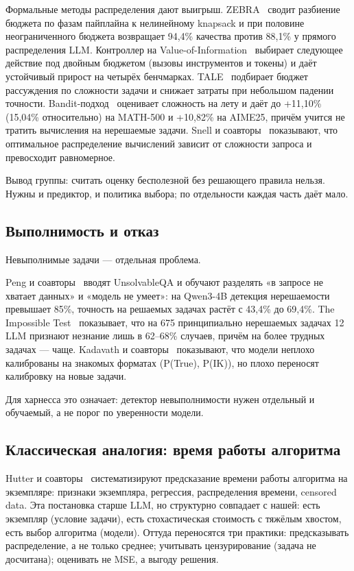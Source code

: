 \documentclass[11pt,a4paper]{article}
\begin{document}
Формальные методы распределения дают выигрыш. ZEBRA~\cite{hamri2026zebra}
сводит разбиение бюджета по фазам пайплайна к нелинейному knapsack и при
половине неограниченного бюджета возвращает 94{,}4\% качества против 88{,}1\%
у прямого распределения LLM. Контроллер на Value-of-Information~\cite{fang2026voi}
выбирает следующее действие под двойным бюджетом (вызовы инструментов и
токены) и даёт устойчивый прирост на четырёх бенчмарках. TALE~\cite{han2025tale}
подбирает бюджет рассуждения по сложности задачи и снижает затраты при
небольшом падении точности. Bandit-подход~\cite{zuo2025bandit} оценивает
сложность на лету и даёт до +11{,}10\% (15{,}04\% относительно) на MATH-500 и
+10{,}82\% на AIME25, причём учится не тратить вычисления на нерешаемые
задачи. Snell и соавторы~\cite{snell2024scaling} показывают, что оптимальное
распределение вычислений зависит от сложности запроса и превосходит
равномерное.

Вывод группы: считать оценку бесполезной без решающего правила нельзя.
Нужны и предиктор, и политика выбора; по отдельности каждая часть даёт мало.

\subsection{Выполнимость и отказ}

Невыполнимые задачи — отдельная проблема.

Peng и соавторы~\cite{peng2026solvability} вводят UnsolvableQA и обучают
разделять «в запросе не хватает данных» и «модель не умеет»: на Qwen3-4B
детекция нерешаемости превышает 85\%, точность на решаемых задачах растёт с
43{,}4\% до 69{,}4\%. The Impossible Test~\cite{noever2024impossible}
показывает, что на 675 принципиально нерешаемых задачах 12 LLM признают
незнание лишь в 62--68\% случаев, причём на более трудных задачах — чаще.
Kadavath и соавторы~\cite{kadavath2022know} показывают, что модели неплохо
калиброваны на знакомых форматах (P(True), P(IK)), но плохо переносят
калибровку на новые задачи.

Для харнесса это означает: детектор невыполнимости нужен отдельный и
обучаемый, а не порог по уверенности модели.

\subsection{Классическая аналогия: время работы алгоритма}

Hutter и соавторы~\cite{hutter2014runtime} систематизируют предсказание
времени работы алгоритма на экземпляре: признаки экземпляра, регрессия,
распределения времени, censored data. Эта постановка старше LLM, но
структурно совпадает с нашей: есть экземпляр (условие задачи), есть
стохастическая стоимость с тяжёлым хвостом, есть выбор алгоритма (модели).
Оттуда переносятся три практики: предсказывать распределение, а не только
среднее; учитывать цензурирование (задача не досчитана); оценивать не MSE, а
выгоду решения.
\end{document}

